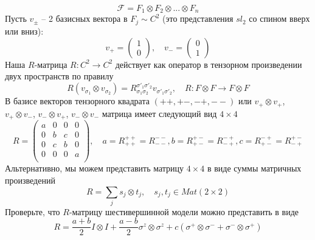 \documentclass[12pt]{article}
\theoremstyle{definition}
\begin{document}
\begin{enumerate}
\begin{itemize}
\begin{equation}
            \mathcal{F}=F_1\otimes F_2\otimes ...\otimes F_n
        \end{equation}
        Пусть $v_\pm$ -- 2 базисных вектора в $F_j\sim C^2$ (это представления $sl_2$ со спином вверх или вниз):
        \begin{equation}
            v_+=\begin{pmatrix}
                1\\
                0
            \end{pmatrix},\quad v_-=\begin{pmatrix}
                0\\
                1
            \end{pmatrix}
        \end{equation}
        Наша $R$-матрица $R:C^2\rightarrow C^2$ действует как оператор в тензорном произведении двух пространств по правилу
        \begin{equation}
            R(v_{\sigma_1}\otimes v_{\sigma_2})=R^{\sigma'_1\sigma'_2}_{\sigma_1\sigma_2}v_{\sigma'_1\sigma'_2},\quad R:F\otimes F\rightarrow F\otimes F
        \end{equation}
        В базисе векторов тензорного квадрата $(++,+-,-+,--)$ или $v_+\otimes v_+$, $v_+\otimes v_-$, $v_-\otimes v_+$, $v_-\otimes v_-$ матрица имеет следующий вид $4\times4$
        \begin{equation}
            R=\begin{pmatrix}
                a & 0 & 0 & 0\\
                0 & b & c & 0\\
                0 & c & b & 0\\
                0 & 0 & 0 & a\\
            \end{pmatrix},\quad a=R^{++}_{++}=R^{--}_{--}, b=R^{+-}_{+-}=R^{-+}_{-+}, c=R^{-+}_{+-}=R^{+-}_{-+}
        \end{equation}
        Альтернативно, мы можем представить матрицу $4\times4$ в виде суммы матричных произведений
        \begin{equation}
            R=\sum\limits_js_j\otimes t_j,\quad s_j,t_j\in Mat(2\times2)
        \end{equation}
        Проверьте, что $R$-матрицу шестивершинной модели можно представить в виде
        \begin{equation}
            R=\frac{a+b}{2}I\otimes I+\frac{a-b}{2}\sigma^z\otimes\sigma^z+c(\sigma^+\otimes\sigma^-+\sigma^-\otimes\sigma^+)
        \end{equation}

\end{itemize}
\end{enumerate}
\end{document}
